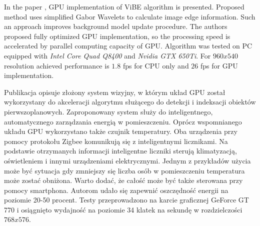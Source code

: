 \documentclass[b5paper,10pt,twoside]{article}
\begin{document}
{In the paper \cite{Qin_2015}, GPU implementation of ViBE algorithm is presented. Proposed method uses simplified Gabor Wavelets to calculate image edge information. Such an approach improves background model update procedure. The authors proposed fully optimized GPU implementation, so the processing speed is accelerated by parallel computing capacity of GPU. Algorithm was tested on PC equipped with \textit{Intel Core Quad Q8400} and \textit{Nvidia GTX 650Ti}. For $960x540$ resolution achieved performance is $1.8$ fps for CPU only and $26$ fps for GPU implementation.   
 


Publikacja \cite{Song_2016} opisuje złożony system wizyjny, w którym układ GPU został wykorzystany do akceleracji algorytmu służącego do detekcji i indeksacji obiektów pierwszoplanowych. 
Zaproponowany system służy do inteligentnego, automatycznego zarządzania energią w pomieszczeniu. 
Oprócz wspomnianego układu GPU wykorzystano także czujnik temperatury. 
Oba urządzenia przy pomocy protokołu Zigbee komunikują się z inteligentnymi licznikami. 
Na podstawie otrzymanych informacji inteligentne liczniki sterują klimatyzacją, oświetleniem i innymi urządzeniami elektrycznymi. 
Jednym z przykładów użycia może być sytuacja gdy zmniejszy się liczba osób w pomieszczeniu temperatura może zostać obniżona. 
Warto dodać, że całość może być także sterowana przy pomocy smartphona. 
Autorom udało się zapewnić oszczędność energii na poziomie 20-50 procent. 
Testy przeprowadzono na karcie graficznej GeForce GT 770 i osiągnięto wydajność na poziomie 34 klatek na sekundę w rozdzielczości $768x576$.

}
\end{document}

